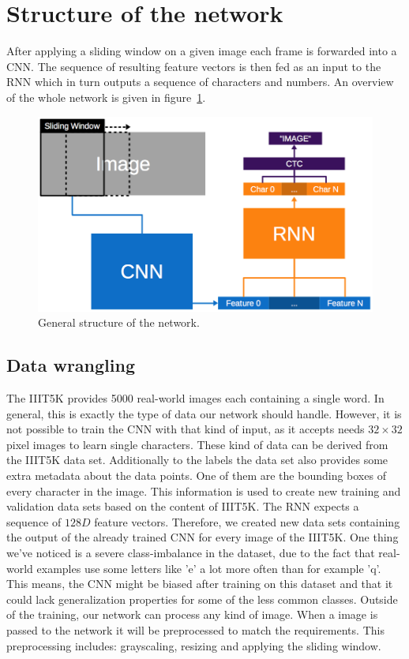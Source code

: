 \documentclass{utue} %
\begin{document}
\section{Structure of the network}

After applying a sliding window on a given image each frame is forwarded into a CNN. The sequence of resulting feature vectors is then fed as an input to the RNN which in turn outputs a sequence of characters and numbers. An overview of the whole network is given in figure~\ref{fig:model_general}.
\begin{figure}[h]
	\centering
	\includegraphics[width=.9\columnwidth]{graphics/model_general.png}
	\caption{\label{fig:model_general}General structure of the network.}
\end{figure}


\subsection{Data wrangling}
The IIIT5K provides 5000 real-world images each containing a single word. In general, this is exactly the type of data our network should handle. However, it is not possible to train the CNN with that kind of input, as it accepts needs $32\times32$ pixel images to learn single characters. These kind of data can be derived from the IIIT5K data set. Additionally to the labels the data set also provides some extra metadata about the data points. One of them are the bounding boxes of every character in the image. This information is used to create  new training and validation data sets based on the content of IIIT5K. The RNN expects a sequence of $128D$ feature vectors. Therefore, we created new data sets containing the output of the already trained CNN for every image of the IIIT5K. One thing we've noticed is a severe class-imbalance in the dataset, due to the fact that real-world examples use some letters like 'e' a lot more often than for example 'q'. This means, the CNN might be biased after training on this dataset and that it could lack generalization properties for some of the less common classes.
Outside of the training, our network can process any kind of image. When a image is passed to the network it will be preprocessed to match the requirements. This preprocessing includes: grayscaling, resizing and applying the sliding window.
\end{document}
